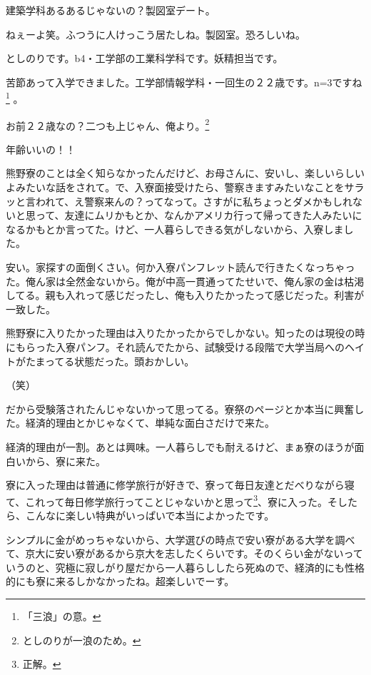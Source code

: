 \begin{multicols}{2}
建築学科あるあるじゃないの？製図室デート。

ねぇーよ笑。ふつうに人けっこう居たしね。製図室。恐ろしいね。

としのりです。b4・工学部の工業科学科です。妖精担当です。

苦節あって入学できました。工学部情報学科・一回生の２２歳です。n=3ですね\footnote{「三浪」の意。} 。

お前２２歳なの？二つも上じゃん、俺より。\footnote{としのりが一浪のため。}

年齢いいの！！


\vspace{15mm}


熊野寮のことは全く知らなかったんだけど、お母さんに、安いし、楽しいらしいよみたいな話をされて。で、入寮面接受けたら、警察きますみたいなことをサラッと言われて、え警察来んの？ってなって。さすがに私ちょっとダメかもしれないと思って、友達にムリかもとか、なんかアメリカ行って帰ってきた人みたいになるかもとか言ってた。けど、一人暮らしできる気がしないから、入寮しました。

安い。家探すの面倒くさい。何か入寮パンフレット読んで行きたくなっちゃった。俺ん家は全然金ないから。俺が中高一貫通ってたせいで、俺ん家の金は枯渇してる。親も入れって感じだったし、俺も入りたかったって感じだった。利害が一致した。

熊野寮に入りたかった理由は入りたかったからでしかない。知ったのは現役の時にもらった入寮パンフ。それ読んでたから、試験受ける段階で大学当局へのヘイトがたまってる状態だった。頭おかしい。

（笑）

だから受験落されたんじゃないかって思ってる。寮祭のページとか本当に興奮した。経済的理由とかじゃなくて、単純な面白さだけで来た。

経済的理由が一割。あとは興味。一人暮らしでも耐えるけど、まぁ寮のほうが面白いから、寮に来た。

寮に入った理由は普通に修学旅行が好きで、寮って毎日友達とだべりながら寝て、これって毎日修学旅行ってことじゃないかと思って\footnote{正解。}、寮に入った。そしたら、こんなに楽しい特典がいっぱいで本当によかったです。

シンプルに金がめっちゃないから、大学選びの時点で安い寮がある大学を調べて、京大に安い寮があるから京大を志したくらいです。そのくらい金がないっていうのと、究極に寂しがり屋だから一人暮らししたら死ぬので、経済的にも性格的にも寮に来るしかなかったね。超楽しいでーす。


\end{multicols}

